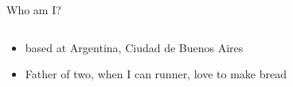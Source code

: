 \begin{frame}{Who am I?}
\begin{columns}
\begin{column}{0.7\textwidth}
\begin{itemize}
\item based at Argentina, Ciudad de Buenos Aires
\item  Father of two, when I can runner, love to make bread
\end{itemize}
    \end{column}
  \end{columns}
\end{frame}
